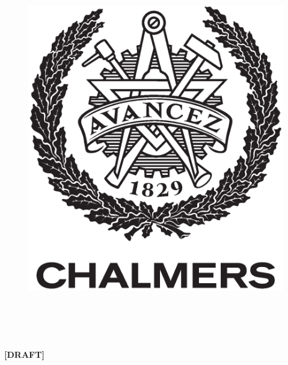 {\begin{center}
\begin{figure}[H]
		\includegraphics[width=0.2\pdfpagewidth]{template/figures/AvancezChalmers_black_centered.eps} \\
		\fi
		\end{figure}	\vspace{5mm}

		\thesisDepartment\\
		\ifx\thesisGroup\undefined
		\else
		\thesisGroup\\
		\fi
		\textsc{\thesisUniversity}\\
		\thesisLocation\ \thesisYear\\
	\else
		\vspace{5cm}
		\textbf{\Huge [DRAFT]}
	\fi
\end{center}
}
